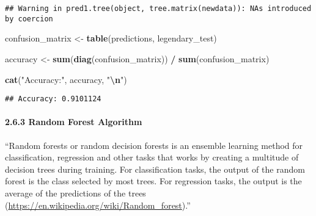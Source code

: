 \documentclass[
]{article}
\newenvironment{Shaded}{\begin{snugshade}}{\end{snugshade}}
\newcommand{\AttributeTok}[1]{\textcolor[rgb]{0.13,0.29,0.53}{#1}}
\newcommand{\ConstantTok}[1]{\textcolor[rgb]{0.56,0.35,0.01}{#1}}
\newcommand{\FunctionTok}[1]{\textcolor[rgb]{0.13,0.29,0.53}{\textbf{#1}}}
\newcommand{\NormalTok}[1]{#1}
\newcommand{\OtherTok}[1]{\textcolor[rgb]{0.56,0.35,0.01}{#1}}
\newcommand{\SpecialCharTok}[1]{\textcolor[rgb]{0.81,0.36,0.00}{\textbf{#1}}}
\newcommand{\StringTok}[1]{\textcolor[rgb]{0.31,0.60,0.02}{#1}}
\begin{document}
\begin{verbatim}
## Warning in pred1.tree(object, tree.matrix(newdata)): NAs introduced by coercion
\end{verbatim}

\begin{Shaded}
\begin{Highlighting}[]
\NormalTok{confusion\_matrix }\OtherTok{\textless{}{-}} \FunctionTok{table}\NormalTok{(predictions, legendary\_test)}

\NormalTok{accuracy }\OtherTok{\textless{}{-}} \FunctionTok{sum}\NormalTok{(}\FunctionTok{diag}\NormalTok{(confusion\_matrix)) }\SpecialCharTok{/} \FunctionTok{sum}\NormalTok{(confusion\_matrix)}

\FunctionTok{cat}\NormalTok{(}\StringTok{"Accuracy:"}\NormalTok{, accuracy, }\StringTok{"}\SpecialCharTok{\textbackslash{}n}\StringTok{"}\NormalTok{)}
\end{Highlighting}
\end{Shaded}

\begin{verbatim}
## Accuracy: 0.9101124
\end{verbatim}

\paragraph{2.6.3 Random Forest Algorithm}\label{random-forest-algorithm}

``Random forests or random decision forests is an ensemble learning
method for classification, regression and other tasks that works by
creating a multitude of decision trees during training. For
classification tasks, the output of the random forest is the class
selected by most trees. For regression tasks, the output is the average
of the predictions of the trees
(\url{https://en.wikipedia.org/wiki/Random_forest}).''

\begin{Shaded}
\end{Shaded}
\end{document}
